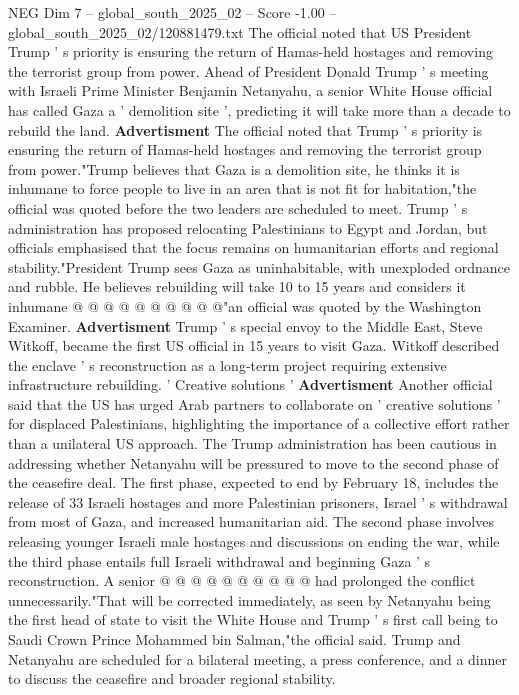 \begin{textsample}{NEG Dim 7 – global\_south\_2025\_02 – Score -1.00 – global\_south\_2025\_02/120881479.txt}  \label{ex:f7_neg_034}
The official noted that US President Trump ' s priority is ensuring the return of Hamas-held hostages and removing the terrorist group from power.
Ahead of President Donald Trump ' s meeting with Israeli Prime Minister Benjamin Netanyahu, a senior White House official has called Gaza a ' demolition site ', predicting it will take more than a decade to rebuild the land. \textbf{Advertisment} The official noted that Trump ' s priority is ensuring the return of Hamas-held hostages and removing the terrorist group from power."Trump believes that Gaza is a demolition site, he thinks it is inhumane to force people to live in an area that is not fit for habitation,"the official was quoted before the two leaders are scheduled to meet.
Trump ' s administration has proposed relocating Palestinians to Egypt and Jordan, but officials emphasised that the focus remains on humanitarian efforts and regional stability."President Trump sees Gaza as uninhabitable, with unexploded ordnance and rubble.
He believes rebuilding will take 10 to 15 years and considers it inhumane @ @ @ @ @ @ @ @ @ @"an official was quoted by the Washington Examiner. \textbf{Advertisment} Trump ' s special envoy to the Middle East, Steve Witkoff, became the first US official in 15 years to visit Gaza.
Witkoff described the enclave ' s reconstruction as a long-term project requiring extensive infrastructure rebuilding. ' Creative solutions ' \textbf{Advertisment} Another official said that the US has urged Arab partners to collaborate on ' creative solutions ' for displaced Palestinians, highlighting the importance of a collective effort rather than a unilateral US approach.
The Trump administration has been cautious in addressing whether Netanyahu will be pressured to move to the second phase of the ceasefire deal.
The first phase, expected to end by February 18, includes the release of 33 Israeli hostages and more Palestinian prisoners, Israel ' s withdrawal from most of Gaza, and increased humanitarian aid.
The second phase involves releasing younger Israeli male hostages and discussions on ending the war, while the third phase entails full Israeli withdrawal and beginning Gaza ' s reconstruction.
A senior @ @ @ @ @ @ @ @ @ @ had prolonged the conflict unnecessarily."That will be corrected immediately, as seen by Netanyahu being the first head of state to visit the White House and Trump ' s first call being to Saudi Crown Prince Mohammed bin Salman,"the official said.
Trump and Netanyahu are scheduled for a bilateral meeting, a press conference, and a dinner to discuss the ceasefire and broader regional stability.

\end{textsample}
